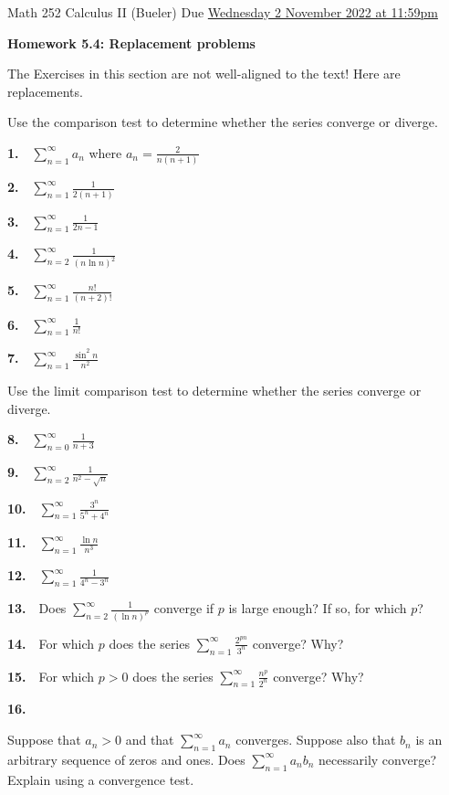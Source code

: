 \documentclass[12pt]{amsart}
\newcommand{\ds}{\displaystyle}
\begin{document}
\scriptsize \noindent Math 252 Calculus II (Bueler) \hfill Due \underline{Wednesday 2 November 2022 at 11:59pm}
\normalsize

\Large
\bigskip
\centerline{\textbf{Homework 5.4: Replacement problems}}
\medskip
\normalsize

\thispagestyle{empty}

\bigskip

The Exercises in this section are not well-aligned to the text!  Here are replacements.

\bigskip
\noindent Use the comparison test to determine whether the series converge or diverge.

\newcommand{\pr}[1]{\bigskip \textbf{#1.} \,\,}

\pr{1} $\ds \sum_{n=1}^\infty a_n$ where $\ds a_n = \frac{2}{n(n+1)}$

\pr{2} $\ds \sum_{n=1}^\infty \frac{1}{2(n+1)}$

\pr{3} $\ds \sum_{n=1}^\infty \frac{1}{2n - 1}$

\pr{4} $\ds \sum_{n=2}^\infty \frac{1}{(n\ln n)^2}$

\pr{5} $\ds \sum_{n=1}^\infty \frac{n!}{(n+2)!}$

\pr{6} $\ds \sum_{n=1}^\infty \frac{1}{n!}$

\pr{7} $\ds \sum_{n=1}^\infty \frac{\sin^2 n}{n^2}$

\bigskip
\noindent Use the limit comparison test to determine whether the series converge or diverge.

\pr{8} $\ds \sum_{n=0}^\infty \frac{1}{n+3}$

\pr{9} $\ds \sum_{n=2}^\infty \frac{1}{n^2 - \sqrt{n}}$

\pr{10} $\ds \sum_{n=1}^\infty \frac{3^n}{5^n + 4^n}$

\pr{11} $\ds \sum_{n=1}^\infty \frac{\ln n}{n^3}$

\pr{12} $\ds \sum_{n=1}^\infty \frac{1}{4^n - 3^n}$

\bigskip
\pr{13} Does $\ds \sum_{n=2}^\infty \frac{1}{(\ln n)^p}$ converge if $p$ is large enough?  If so, for which $p$?

\pr{14} For which $p$ does the series $\ds \sum_{n=1}^\infty \frac{2^{pn}}{3^n}$ converge?  Why?

\pr{15} For which $p>0$ does the series $\ds \sum_{n=1}^\infty \frac{n^p}{2^n}$ converge?  Why?

\pr{16} \begin{minipage}[t]{5.5in} Suppose that $a_n>0$ and that $\ds \sum_{n=1}^\infty a_n$ converges.  Suppose also that $b_n$ is an arbitrary sequence of zeros and ones. Does $\ds \sum_{n=1}^\infty a_n b_n$ necessarily converge?  Explain using a convergence test. \end{minipage}
\end{document}
